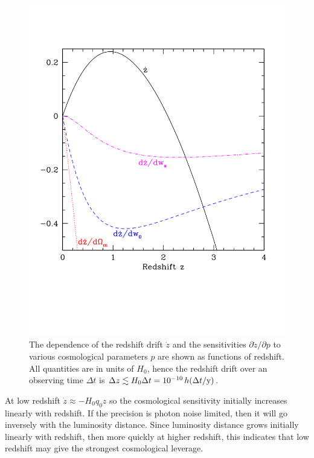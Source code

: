 \documentclass[preprint2, 10pt]{aastex}
\begin{document}
\begin{figure}[!htbp] 
   \centering
   \includegraphics[width=\columnwidth]{zdriftd.pdf}
\caption{The dependence of the redshift drift $\dot z$ and the sensitivities 
$\partial\dot z/\partial p$ to various cosmological parameters $p$ are shown 
as functions of redshift. All quantities are in units of $H_0$, hence 
the redshift drift over an observing time $\Delta t$ is 
$\Delta z\lesssim H_0\Delta t=10^{-10}\,h(\Delta t/{\rm y})$. 
}
\label{fig:sens} 
\end{figure}


At low redshift $\dot z\approx -H_0q_0z$ so the cosmological sensitivity 
initially increases linearly with redshift. If the precision is photon 
noise limited, then it will go inversely with the luminosity distance. 
Since luminosity distance grows initially linearly with redshift, then 
more quickly at higher redshift, this indicates that low redshift may give 
the strongest cosmological leverage. 
\end{document}
